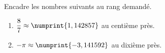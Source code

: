 %
%
    Encadre les nombres suivants au rang demandé.
    \begin{enumerate}[cols=2]
        \item $\dfrac{8}{7} \approx \numprint{1,142857}$ au centième près.
        \item $-\pi \approx \numprint{-3,141592}$ au dixième près.
    \end{enumerate}
    \vspace*{2cm}
